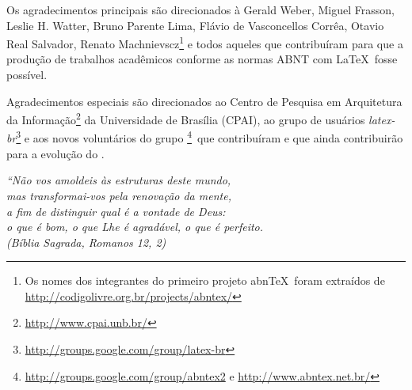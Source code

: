 \documentclass[
	12pt,				%
	oneside,			%
	a4paper,			%
	chapter=TITLE,		%
	english,			%
	brazil				%
	]{abntex2}
\begin{document}
\begin{agradecimentos}
Os agradecimentos principais são direcionados à Gerald Weber, Miguel Frasson,
Leslie H. Watter, Bruno Parente Lima, Flávio de Vasconcellos Corrêa, Otavio Real
Salvador, Renato Machnievscz\footnote{Os nomes dos integrantes do primeiro
projeto abn\TeX\ foram extraídos de
\url{http://codigolivre.org.br/projects/abntex/}} e todos aqueles que
contribuíram para que a produção de trabalhos acadêmicos conforme
as normas ABNT com \LaTeX\ fosse possível.

Agradecimentos especiais são direcionados ao Centro de Pesquisa em Arquitetura
da Informação\footnote{\url{http://www.cpai.unb.br/}} da Universidade de
Brasília (CPAI), ao grupo de usuários
\emph{latex-br}\footnote{\url{http://groups.google.com/group/latex-br}} e aos
novos voluntários do grupo
\emph{\abnTeX}\footnote{\url{http://groups.google.com/group/abntex2} e
\url{http://www.abntex.net.br/}}~que contribuíram e que ainda
contribuirão para a evolução do \abnTeX.

\end{agradecimentos}

\begin{epigrafe}
    \vspace*{\fill}
	\begin{flushright}
		\textit{``Não vos amoldeis às estruturas deste mundo, \\
		mas transformai-vos pela renovação da mente, \\
		a fim de distinguir qual é a vontade de Deus: \\
		o que é bom, o que Lhe é agradável, o que é perfeito.\\
		(Bíblia Sagrada, Romanos 12, 2)}
	\end{flushright}
\end{epigrafe}
\end{document}
